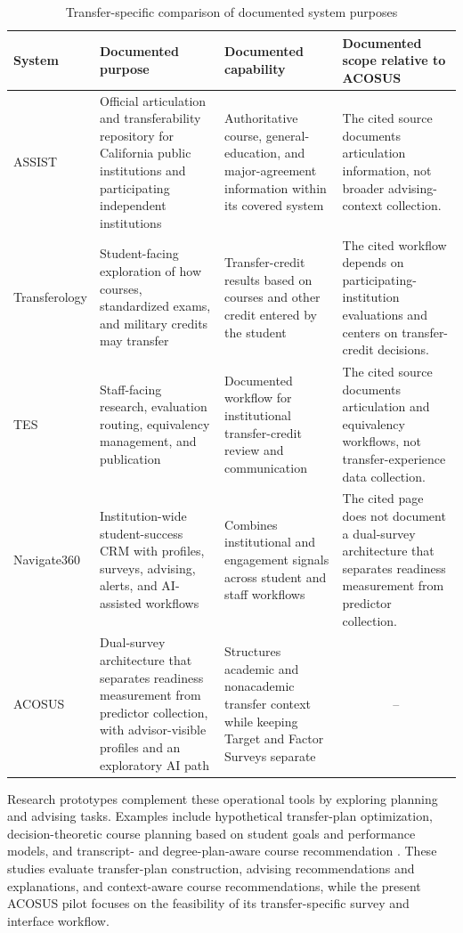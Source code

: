\documentclass[letterpaper,11pt]{article}
\begin{document}
\begin{table}[htbp]
\caption{Transfer-specific comparison of documented system purposes}
\label{tab:comparison}
\centering
{\renewcommand{\arraystretch}{1.16}
\begin{tabular}{@{}p{2.6cm}p{4.0cm}p{4.0cm}p{4.5cm}@{}}
\toprule
\textbf{System} & \textbf{Documented purpose} & \textbf{Documented capability} & \textbf{Documented scope relative to ACOSUS} \\
\midrule
ASSIST & Official articulation and transferability repository for California public institutions and participating independent institutions & Authoritative course, general-education, and major-agreement information within its covered system & The cited source documents articulation information, not broader advising-context collection. \\
\addlinespace[3pt]
Transferology & Student-facing exploration of how courses, standardized exams, and military credits may transfer & Transfer-credit results based on courses and other credit entered by the student & The cited workflow depends on participating-institution evaluations and centers on transfer-credit decisions. \\
\addlinespace[3pt]
TES & Staff-facing research, evaluation routing, equivalency management, and publication & Documented workflow for institutional transfer-credit review and communication & The cited source documents articulation and equivalency workflows, not transfer-experience data collection. \\
\addlinespace[3pt]
Navigate360 & Institution-wide student-success CRM with profiles, surveys, advising, alerts, and AI-assisted workflows & Combines institutional and engagement signals across student and staff workflows & The cited page does not document a dual-survey architecture that separates readiness measurement from predictor collection. \\
\addlinespace[3pt]
ACOSUS & Dual-survey architecture that separates readiness measurement from predictor collection, with advisor-visible profiles and an exploratory AI path & Structures academic and nonacademic transfer context while keeping Target and Factor Surveys separate & \multicolumn{1}{c}{--} \\
\bottomrule
\end{tabular}
}
\end{table}

Research prototypes complement these operational tools by exploring planning and advising tasks. Examples include hypothetical transfer-plan optimization, decision-theoretic course planning based on student goals and performance models, and transcript- and degree-plan-aware course recommendation \parencites[pp.~3, 5, 12, 19]{nguyen2024optimal}[pp.~1, 4]{mattei2014advising}[pp.~1, 4--6]{mi2025smartcourse}. These studies evaluate transfer-plan construction, advising recommendations and explanations, and context-aware course recommendations, while the present ACOSUS pilot focuses on the feasibility of its transfer-specific survey and interface workflow.
\end{document}
